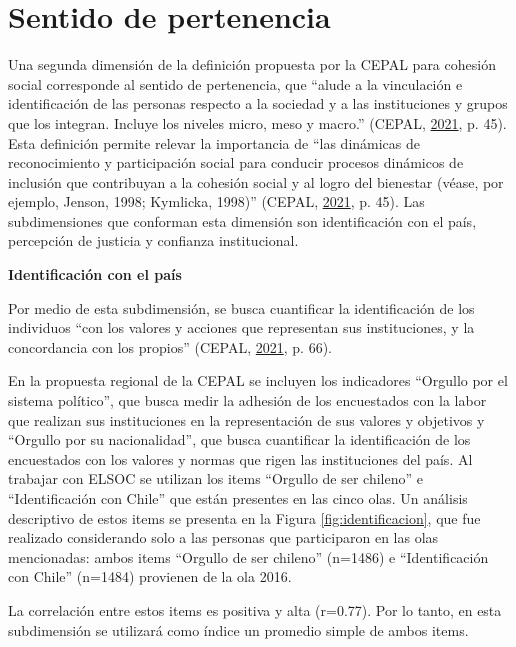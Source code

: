 \documentclass[
  12pt,
]{book}
\begin{document}
\hypertarget{sentido-de-pertenencia}{%
\section{Sentido de pertenencia}\label{sentido-de-pertenencia}}

Una segunda dimensión de la definición propuesta por la CEPAL para cohesión social corresponde al sentido de pertenencia, que ``alude a la vinculación e identificación de las personas respecto a la sociedad y a las instituciones y grupos que los integran. Incluye los niveles micro, meso y macro.'' (CEPAL, \protect\hyperlink{ref-cepal_cohesion_2021}{2021}, p. 45). Esta definición permite relevar la importancia de ``las dinámicas de reconocimiento y participación social para conducir procesos dinámicos de inclusión que contribuyan a la cohesión social y al logro del bienestar (véase, por ejemplo, Jenson, 1998; Kymlicka, 1998)'' (CEPAL, \protect\hyperlink{ref-cepal_cohesion_2021}{2021}, p. 45). Las subdimensiones que conforman esta dimensión son identificación con el país, percepción de justicia y confianza institucional.

\textbf{Identificación con el país}

Por medio de esta subdimensión, se busca cuantificar la identificación de los individuos ``con los valores y acciones que representan sus instituciones, y la concordancia con los propios'' (CEPAL, \protect\hyperlink{ref-cepal_cohesion_2021}{2021}, p. 66).

En la propuesta regional de la CEPAL se incluyen los indicadores ``Orgullo por el sistema político'', que busca medir la adhesión de los encuestados con la labor que realizan sus instituciones en la representación de sus valores y objetivos y ``Orgullo por su nacionalidad'', que busca cuantificar la identificación de los encuestados con los valores y normas que rigen las instituciones del país. Al trabajar con ELSOC se utilizan los items ``Orgullo de ser chileno'' e ``Identificación con Chile'' que están presentes en las cinco olas. Un análisis descriptivo de estos items se presenta en la Figura \ref{fig:identificacion}, que fue realizado considerando solo a las personas que participaron en las olas mencionadas: ambos items ``Orgullo de ser chileno'' (n=1486) e ``Identificación con Chile'' (n=1484) provienen de la ola 2016.

La correlación entre estos items es positiva y alta (r=0.77). Por lo tanto, en esta subdimensión se utilizará como índice un promedio simple de ambos items.
\end{document}
